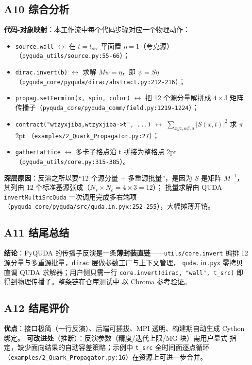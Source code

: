 \documentclass[UTF8]{ctexart}
\begin{document}
\subsection{A10 综合分析}
\textbf{代码-对象映射}：本工作流中每个代码步骤对应一个物理动作：
\begin{itemize}
  \item \texttt{source.wall} $\leftrightarrow$ 在 $t=t_{src}$ 平面置 $\eta=1$（夸克源）
        （\texttt{\nolinkurl{pyquda_utils/source.py:55-66}}）；
  \item \texttt{dirac.invert(b)} $\leftrightarrow$ 求解 $M\psi=\eta$，即 $\psi=S\eta$
        （\texttt{\nolinkurl{pyquda_core/pyquda/dirac/abstract.py:212-216}}）；
  \item \texttt{propag.setFermion(x, spin, color)} $\leftrightarrow$ 把 12 个源分量解拼成
        $4\times 3$ 矩阵传播子（\texttt{\nolinkurl{pyquda_core/pyquda_comm/field.py:1219-1224}}）；
  \item \texttt{contract("wtzyxjiba,wtzyxjiba->t", ...)} $\leftrightarrow$
        $\sum_{xyz,\alpha\beta,a} |S(x,t)|^2$ 求 $\pi$ 2pt
        （\texttt{\nolinkurl{examples/2_Quark_Propagator.py:27}}）；
  \item \texttt{gatherLattice} $\leftrightarrow$ 多卡子格点沿 t 拼接为整格点 2pt
        （\texttt{\nolinkurl{pyquda_utils/core.py:315-385}}）。
\end{itemize}
\textbf{深层原因}：反演之所以要“12 个源分量 + 多重源批量”，是因为 $S$ 是矩阵
$M^{-1}$，其列由 12 个标准基源张成（$N_s\times N_c=4\times 3=12$）；
批量求解由 QUDA \texttt{invertMultiSrcQuda} 一次调用完成多右端项
（\texttt{\nolinkurl{pyquda_core/pyquda/src/quda.in.pyx:252-255}}），大幅摊薄开销。

\subsection{A11 结尾总结}
\begin{conclbox}
\textbf{结论}：PyQUDA 的传播子反演是一条\textbf{薄封装直链}——\texttt{utils/core.invert}
编排 12 源分量与多重源批量，\texttt{dirac} 层做参数工厂与上下文管理，
\texttt{quda.in.pyx} 零拷贝直调 QUDA 求解器；用户侧只需一行
\texttt{core.invert(dirac, "wall", t\_src)} 即得到物理传播子。整条链在仓库测试中
以 Chroma 参考验证。
\end{conclbox}

\subsection{A12 结尾评价}
\textbf{优点}：接口极简（一行反演）、后端可插拔、MPI 透明、构建期自动生成 Cython 绑定。
\textbf{可改进处}（\textcolor{relation}{推断}）：反演参数（精度/迭代上限/MG 块）需用户显式
指定，缺少面向结果的自动容差策略；示例中 \texttt{t\_src} 全时间面逐点循环
（\texttt{\nolinkurl{examples/2_Quark_Propagator.py:16}}）在资源上可进一步合并。
\end{document}
